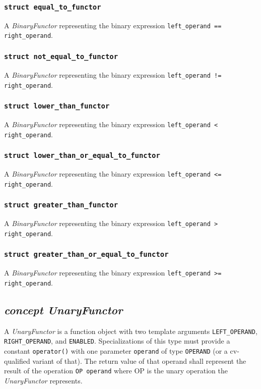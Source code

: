 \documentclass[oneside]{article}
\begin{document}
\subsubsection{\texttt{struct equal\_to\_functor}}
A \textit{BinaryFunctor} representing the binary expression \verb|left_operand == right_operand|.

\subsubsection{\texttt{struct not\_equal\_to\_functor}}
A \textit{BinaryFunctor} representing the binary expression \verb|left_operand != right_operand|.

\subsubsection{\texttt{struct lower\_than\_functor}}
A \textit{BinaryFunctor} representing the binary expression \verb|left_operand < right_operand|.

\subsubsection{\texttt{struct lower\_than\_or\_equal\_to\_functor}}
A \textit{BinaryFunctor} representing the binary expression \verb|left_operand <= right_operand|.

\subsubsection{\texttt{struct greater\_than\_functor}}
A \textit{BinaryFunctor} representing the binary expression \verb|left_operand > right_operand|.

\subsubsection{\texttt{struct greater\_than\_or\_equal\_to\_functor}}
A \textit{BinaryFunctor} representing the binary expression \verb|left_operand >= right_operand|.

\subsection{\textit{concept UnaryFunctor}}
A \textit{UnaryFunctor} is a function object with two template arguments \verb+LEFT_OPERAND+,
\verb+RIGHT_OPERAND+, and \verb+ENABLED+. Specializations of this type must provide a
constant \verb+operator()+ with one parameter \verb+operand+ of type \verb+OPERAND+
(or a cv-qualified variant of that). The return value of that operand shall represent the
result of the operation \verb+OP operand+ where OP is the unary operation
the \textit{UnaryFunctor} represents.\\
\end{document}
